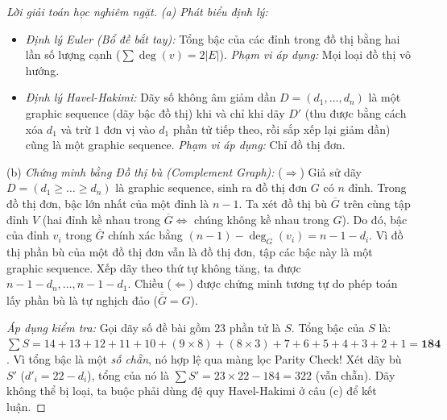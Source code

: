 \documentclass{article}
\begin{document}
\begin{proof}[Lời giải toán học nghiêm ngặt]
	\emph{(a) Phát biểu định lý:}
	\begin{itemize}
		\item \textit{Định lý Euler (Bổ đề bắt tay):} Tổng bậc của các đỉnh trong đồ thị bằng hai lần số lượng cạnh ($\sum \deg(v) = 2|E|$). \textit{Phạm vi áp dụng:} Mọi loại đồ thị vô hướng.
		\item \textit{Định lý Havel-Hakimi:} Dãy số không âm giảm dần $D = (d_1, \ldots, d_n)$ là một graphic sequence (dãy bậc đồ thị) khi và chỉ khi dãy $D'$ (thu được bằng cách xóa $d_1$ và trừ $1$ đơn vị vào $d_1$ phần tử tiếp theo, rồi sắp xếp lại giảm dần) cũng là một graphic sequence. \textit{Phạm vi áp dụng:} Chỉ đồ thị đơn.
	\end{itemize}
	
	\item(b) \textit{Chứng minh bằng Đồ thị bù (Complement Graph):} 
	($\Rightarrow$) Giả sử dãy $D = (d_1 \ge \ldots \ge d_n)$ là graphic sequence, sinh ra đồ thị đơn $G$ có $n$ đỉnh. Trong đồ thị đơn, bậc lớn nhất của một đỉnh là $n-1$. Ta xét đồ thị bù $\overline{G}$ trên cùng tập đỉnh $V$ (hai đỉnh kề nhau trong $\overline{G} \iff$ chúng không kề nhau trong $G$). Do đó, bậc của đỉnh $v_i$ trong $\overline{G}$ chính xác bằng $(n-1) - \deg_G(v_i) = n-1-d_i$. Vì đồ thị phần bù của một đồ thị đơn vẫn là đồ thị đơn, tập các bậc này là một graphic sequence. Xếp dãy theo thứ tự không tăng, ta được $n-1-d_n, \ldots, n-1-d_1$. 
	Chiều ($\Leftarrow$) được chứng minh tương tự do phép toán lấy phần bù là tự nghịch đảo ($\overline{\overline{G}} = G$).
	
	\emph{Áp dụng kiểm tra:} Gọi dãy số đề bài gồm $23$ phần tử là $S$. 
	Tổng bậc của $S$ là: $\sum S = 14+13+12+11+10+(9 \times 8)+(8 \times 3)+7+6+5+4+3+2+1 = \mathbf{184}$. 
	Vì tổng bậc là một \emph{số chẵn}, nó hợp lệ qua màng lọc Parity Check! Xét dãy bù $S'$ ($d'_i = 22 - d_i$), tổng của nó là $\sum S' = 23 \times 22 - 184 = 322$ (vẫn chẵn). Dãy không thể bị loại, ta buộc phải dùng đệ quy Havel-Hakimi ở câu (c) để kết luận.
	

\end{proof}
\end{document}
